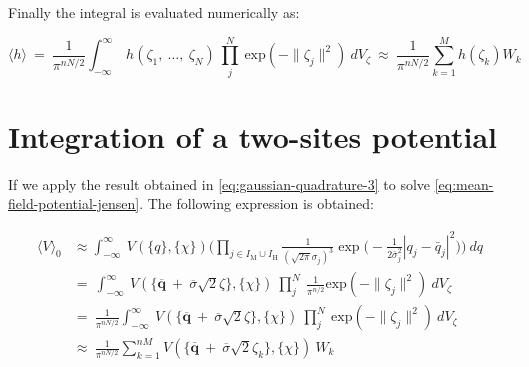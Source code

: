 \documentclass{article}
\begin{document}
Finally the integral is evaluated numerically as:

\begin{equation}
\langle h \rangle\ =\ \frac{1}{\pi^{n N/2}} \int^{\infty}_{-\infty}\ h(\zeta_1,\ \ldots,\ \zeta_N)\ \prod_{j}^{N}\ \text{exp}\left(- \|\zeta_j\|^2\right)\ dV_{\zeta}\ \approx\ \frac{1}{\pi^{n N/2}} \sum_{k=1}^M h(\zeta_k)W_k
\end{equation}

\section{Integration of a two-sites potential}

If we apply the result obtained in \cref{eq:gaussian-quadrature-3} to solve \cref{eq:mean-field-potential-jensen}. The following expression is obtained:

\begin{equation}
\label{eq:mean-field-2-particles-potential}
\begin{split}
    \langle V \rangle_0 &\approx \int^{\infty}_{-\infty}\ V(\{{q}\}, \{{\chi}\}) \Bigg(\prod_{j\in{I_\text{M} \cup  I_\text{H}}} \frac{1}{(\sqrt{2\pi}\sigma_j)^3} \exp \Big(- \frac{1}{2\bar{\sigma}_j^2}|{q}_j - \bar{{q}}_j|^2 \Big) \Bigg)\ dq\\
    &=\ \int^{\infty}_{-\infty}\ V(\{{\overline{\mathbf{q}}\ +\ \overline{\sigma}\sqrt{2}\zeta}\}, \{{\chi}\})\ \prod_{j}^{N}\ \frac{1}{\pi^{n/2}} \text{exp}\left(- \|\zeta_j\|^2\right)\ dV_{\zeta} \\     
    &=\ \frac{1}{\pi^{n N/2}} \int^{\infty}_{-\infty}\ V(\{{\overline{\mathbf{q}}\ +\ \overline{\sigma}\sqrt{2}\zeta}\}, \{{\chi}\})\ \prod_{j}^{N}\ \text{exp}\left(- \|\zeta_j\|^2\right)\ dV_{\zeta} \\ 
    &\approx\ \frac{1}{\pi^{n N/2}} \sum_{k=1}^{nM} V(\{{\overline{\mathbf{q}}\ +\ \overline{\sigma}\sqrt{2}\zeta_k}\}, \{{\chi}\})\ W_k
\end{split}
\end{equation}
\end{document}
